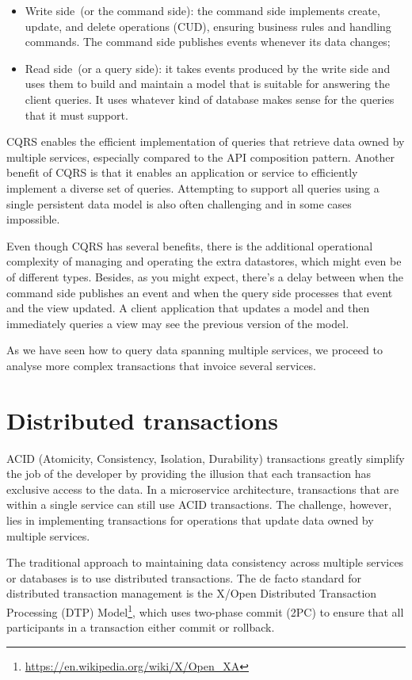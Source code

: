 \documentclass[conference]{IEEEtran}
\begin{document}
\begin{itemize}
  \item Write side (or the command side): the command side implements create, update, and delete operations (CUD), ensuring business rules and handling commands. The command side publishes events whenever its data changes;
  \item Read side (or a query side): it takes events produced by the write side and uses them to build and maintain a model that is suitable for answering the client queries. It uses whatever kind of database makes sense for the queries that it must support.
\end{itemize}

CQRS enables the efficient implementation of queries that retrieve data owned by multiple services, especially compared to the API composition pattern. Another benefit of CQRS is that it enables an application or service to efficiently implement a diverse set of queries. Attempting to support all queries using a single persistent data model is also often challenging and in some cases impossible.

Even though CQRS has several benefits, there is the additional operational complexity of managing and operating the extra datastores, which might even be of different types. Besides, as you might expect, there’s a delay between when the command side publishes an event and when the query side processes that event and the view updated. A client application that updates a model and then immediately queries a view may see the previous version of the model.

As we have seen how to query data spanning multiple services, we proceed to analyse more complex transactions that invoice several services.

\section{Distributed transactions}

ACID (Atomicity, Consistency, Isolation, Durability) transactions greatly simplify the job of the developer by providing the illusion that each transaction has exclusive access to the data. In a microservice architecture, transactions that are within a single service can still use ACID transactions. The challenge, however, lies in implementing transactions for operations that update data owned by multiple services.

The traditional approach to maintaining data consistency across multiple services or databases is to use distributed transactions. The de facto standard for distributed transaction management is the X/Open Distributed Transaction Processing (DTP) Model\footnote{\url{https://en.wikipedia.org/wiki/X/Open_XA}}, which uses two-phase commit (2PC) to ensure that all participants in a transaction either commit or rollback. 
\end{document}
